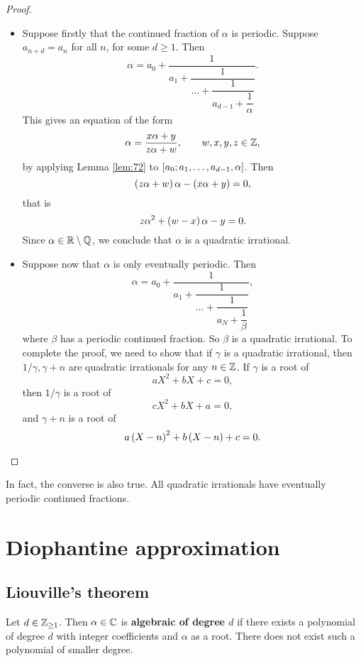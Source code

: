 \begin{proof}
\hfill
\begin{itemize}
\item Suppose firstly that the continued fraction of $ \alpha $ is periodic. Suppose $ a_{n + d} = a_n $ for all $ n $, for some $ d \ge 1 $. Then
$$ \alpha = a_0 + \dfrac{1}{a_1 + \dfrac{1}{\dots + \dfrac{1}{a_{d - 1} + \dfrac{1}{\alpha}}}}. $$
This gives an equation of the form
$$ \alpha = \dfrac{x\alpha + y}{z\alpha + w}, \qquad w, x, y, z \in \mathbb{Z}, $$
by applying Lemma \ref{lem:72} to $ \sbr{a_0; a_1, \dots, a_{d - 1}, \alpha} $. Then
$$ \br{z\alpha + w}\alpha - \br{x\alpha + y} = 0, $$
that is
$$ z\alpha^2 + \br{w - x}\alpha - y = 0. $$
Since $ \alpha \in \mathbb{R} \setminus \mathbb{Q} $, we conclude that $ \alpha $ is a quadratic irrational.
\item Suppose now that $ \alpha $ is only eventually periodic. Then
$$ \alpha = a_0 + \dfrac{1}{a_1 + \dfrac{1}{\dots + \dfrac{1}{a_N + \dfrac{1}{\beta}}}}, $$
where $ \beta $ has a periodic continued fraction. So $ \beta $ is a quadratic irrational. To complete the proof, we need to show that if $ \gamma $ is a quadratic irrational, then $ 1 / \gamma, \gamma + n $ are quadratic irrationals for any $ n \in \mathbb{Z} $. If $ \gamma $ is a root of
$$ aX^2 + bX + c = 0, $$
then $ 1 / \gamma $ is a root of
$$ cX^2 + bX + a = 0, $$
and $ \gamma + n $ is a root of
$$ a\br{X - n}^2 + b\br{X - n} + c = 0. $$
\end{itemize}
\end{proof}

In fact, the converse is also true. All quadratic irrationals have eventually periodic continued fractions.

\pagebreak

\section{Diophantine approximation}

\subsection{Liouville's theorem}

\begin{definition}
Let $ d \in \mathbb{Z}_{\ge 1} $. Then $ \alpha \in \mathbb{C} $ is \textbf{algebraic of degree $ d $} if there exists a polynomial of degree $ d $ with integer coefficients and $ \alpha $ as a root. There does not exist such a polynomial of smaller degree.
\end{definition}

